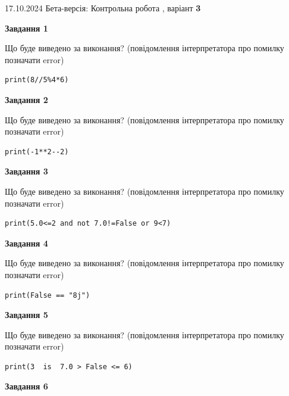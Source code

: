 \documentclass[12pt, ukrainian]{article}
\begin{document}
{\Large{17.10.2024 Бета-версія: Контрольна робота , варіант  \No \textbf { 3 }\par}}
{
\begin {large}
{\begin {center}\textbf{Завдання 1}\end {center}}

Що буде виведено за виконання? (повідомлення інтерпретатора про помилку позначати error)\par
\begin{verbatim}
print(8//5%4*6)
\end{verbatim}

{\begin {center}\textbf{Завдання 2}\end {center}}

Що буде виведено за виконання? (повідомлення інтерпретатора про помилку позначати error)\par
\begin{verbatim}
print(-1**2--2)
\end{verbatim}

{\begin {center}\textbf{Завдання 3}\end {center}}

Що буде виведено за виконання? (повідомлення інтерпретатора про помилку позначати error)\par
\begin{verbatim}
print(5.0<=2 and not 7.0!=False or 9<7)
\end{verbatim}

{\begin {center}\textbf{Завдання 4}\end {center}}

Що буде виведено за виконання? (повідомлення інтерпретатора про помилку позначати error)\par
\begin{verbatim}
print(False == "8j")
\end{verbatim}

{\begin {center}\textbf{Завдання 5}\end {center}}

Що буде виведено за виконання? (повідомлення інтерпретатора про помилку позначати error)\par
\begin{verbatim}
print(3  is  7.0 > False <= 6)
\end{verbatim}

{\begin {center}\textbf{Завдання 6}\end {center}}


\end{large}}
\end{document}
